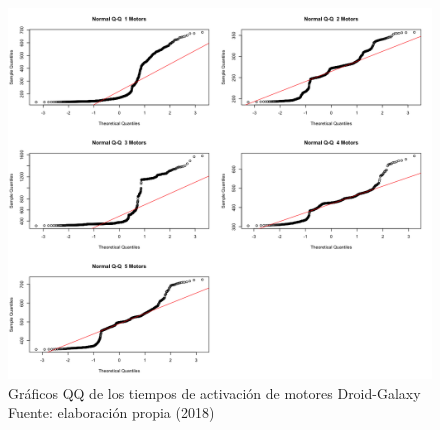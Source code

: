 \begin{figure}[H]
  \begin{center} 
   	\includegraphics[width=1.0\textwidth]{evaluation/graphics/Droid/Galaxy/NormalQQMotorsDroidGalaxy.png} 
   	\captionsetup{justification=centering}
    \caption[Gráfico QQ de os tiempos de activación de motores motores Droid-Galaxy]{Gráficos QQ de los tiempos de activación de motores Droid-Galaxy\\Fuente: elaboración propia (2018)} 
    \label{fig:droid-galaxy-QQ-motors}
  \end{center}
\end{figure}

